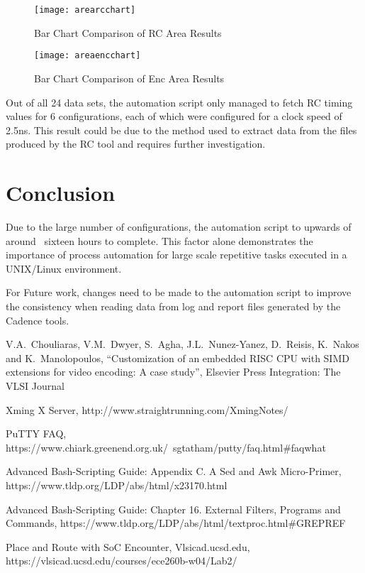 \documentclass[conference]{IEEEtran}
\begin{document}
\begin{figure}[!t]
	\centering
	\texttt{[image: arearcchart]}
	\caption{Bar Chart Comparison of RC Area Results}
	\label{fig_bar1}
\end{figure}

\begin{figure}[!t]
	\centering
	\texttt{[image: areaencchart]}
	\caption{Bar Chart Comparison of Enc Area Results}
	\label{fig_bar2}
\end{figure}


Out of all 24 data sets, the automation script only managed to fetch RC timing values for 6 configurations, each of which were configured for a clock speed of 2.5ns. This result could be due to the method used to extract data from the files produced by the RC tool and requires further investigation.

\section{Conclusion}
Due to the large number of configurations, the automation script to upwards of around ~sixteen hours to complete. This factor alone demonstrates the importance of process automation for large scale repetitive tasks executed in a UNIX/Linux environment.
\newline

For Future work, changes need to be made to the automation script to improve the consistency when reading data from log and report files generated by the Cadence tools. 

\begin{thebibliography}{1}

V.A.~Chouliaras, V.M.~Dwyer, S.~Agha, J.L.~Nunez-Yanez, D.~Reisis, K.~Nakos and K.~Manolopoulos, ``Customization of an embedded RISC CPU with SIMD extensions for video encoding: A case study'', Elsevier Press Integration: The VLSI Journal 

Xming X Server,
http://www.straightrunning.com/XmingNotes/ 

PuTTY FAQ,
https://www.chiark.greenend.org.uk/~sgtatham/putty/faq.html\#faq\-what 

Advanced Bash-Scripting Guide: Appendix C. A Sed and Awk Micro-Primer, https://www.tldp.org/LDP/abs/html/x23170.html 

Advanced Bash-Scripting Guide: Chapter 16. External Filters, Programs and Commands, \newline
https://www.tldp.org/LDP/abs/html/textproc.html\#GREPREF 

Place and Route with SoC Encounter, Vlsicad.ucsd.edu,
https://vlsicad.ucsd.edu/courses/ece260b-w04/Lab2/

\end{thebibliography}
\appendices
\end{document}
